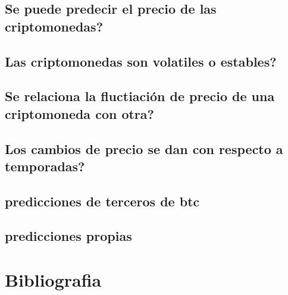 \documentclass[12pt,letterpaper]{article}
\begin{document}
	\subsection*{Se puede predecir el precio de las criptomonedas?}
	\subsection*{Las criptomonedas son volatiles o estables?}
	\subsection*{Se relaciona la fluctiaci\'on de precio de una criptomoneda con otra?}
	\subsection*{Los cambios de precio se dan con respecto a temporadas?}
	\subsection*{predicciones de terceros de btc}
	\subsection*{predicciones propias}
	
\section{Bibliografia}
\end{document}
